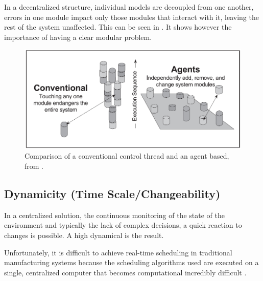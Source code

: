 In a decentralized structure, individual models are decoupled from one another, errors in one module impact only those modules that interact with it, leaving the rest of the system unaffected. This can be seen in . It shows however the importance of having a clear modular problem. 


\begin{figure}[h]
\centering
\includegraphics[width=0.7\linewidth]{img/modularity+decentral-changeability}
\caption{Comparison of a conventional control thread and an agent based, from \citep{parunak1999industrial}.}
\label{fig:modularitydecentral-changeability}
\end{figure}



\subsection{Dynamicity (Time Scale/Changeability)}
In a centralized solution, the continuous monitoring of the state of the environment and typically the lack of complex decisions, a quick reaction to changes is possible. A high dynamical is the result. 

Unfortunately, it is difficult to achieve real-time scheduling in traditional manufacturing systems because the scheduling algorithms used are executed on a single, centralized computer that becomes computational incredibly difficult \citep{duffie1994real}.
